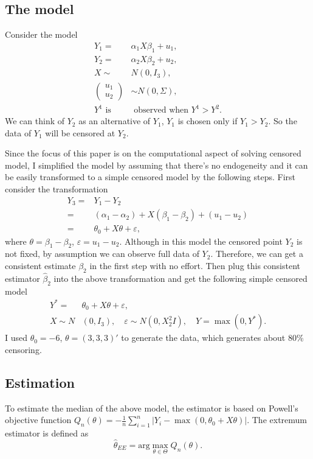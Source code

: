 \documentclass[12pt]{article}
\theoremstyle{plain} \newtheorem{theorem}{Theorem}
\theoremstyle{definition} \newtheorem{definition}{Definition}
\begin{document}
\subsection{The model}
Consider the model
\begin{align*}
  Y_1 = & \alpha_1 X\beta_1 +u_1, \\
  Y_2 = & \alpha_2 X\beta_2 +u_2, \\
  X \sim & N(0,I_3), \\
  \left( \begin{array}{c} u_1 \\ u_2 \end{array} \right)& \sim  N(0,\Sigma), \\
  Y^1 \mbox{ is}& \mbox{ observed when } Y^1> Y^2.
\end{align*}
We can think of $Y_2$ as an alternative of $Y_1$, $Y_1$ is chosen only
if $Y_1>Y_2$. So the data of $Y_1$ will be censored at $Y_2$.

Since the focus of this paper is on the computational aspect of
solving censored model, I simplified the model by assuming that
there's no endogeneity and it can be easily transformed to a simple
censored model by the following steps. First consider the
transformation
\begin{align*}
  Y_3 = & Y_1 -Y_2 \\
  = & (\alpha_1 - \alpha_2) + X(\beta_1 - \beta_2) +(u_1 - u_2) \\
  = & \theta_0 + X\theta + \varepsilon,
\end{align*}
where $\theta = \beta_1 - \beta_2$, $\varepsilon = u_1 -u_2$. Although
in this model the censored point $Y_2$ is not fixed, by assumption we
can observe full data of $Y_2$. Therefore, we can get a consistent
estimate $\beta_2$ in the first step with no effort. Then plug this
consistent estimator $\hat{\beta}_2$ into the above transformation and
get the following simple censored model
\begin{align*}
  Y^{*} = & \theta_0 + X\theta + \varepsilon, \\ 
  X\sim N&(0,I_3), \quad \varepsilon \sim  N(0,X_2^2I), \quad  Y =  \max(0,Y^{*}).
\end{align*}
I used $\theta_0 = -6$, $\theta = (3,3,3)'$ to generate the data,
which generates about 80\% censoring.

\subsection{Estimation}
\label{sec:estimation}
To estimate the median of the above model, the estimator is based on Powell's objective function $Q_n(\theta) = -\frac{1}{n}\sum\limits_{i=1}^n|Y_i-\max(0,\theta_0+X\theta)|$. The extremum estimator is defined as
\begin{equation*}
    \hat{\theta}_{EE} = \mathrm{arg}\max_{\theta\in\Theta} Q_n(\theta).
\end{equation*}
\end{document}
